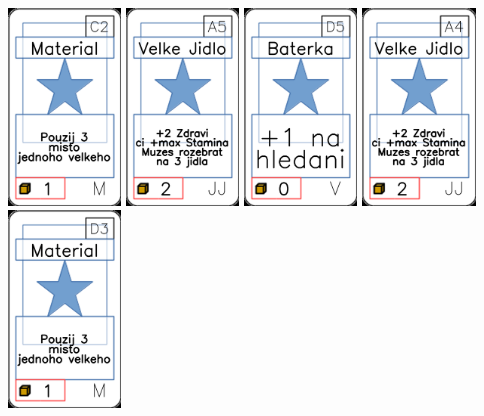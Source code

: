 \documentclass[a4paper]{article}
\begin{document}
	\includegraphics[width=3.0cm]{img-1_41}
	\includegraphics[width=3.0cm]{img-1_34}
	\includegraphics[width=3.0cm]{img-1_79}
	\includegraphics[width=3.0cm]{img-1_33}
	\includegraphics[width=3.0cm]{img-1_47}
\end{document}
